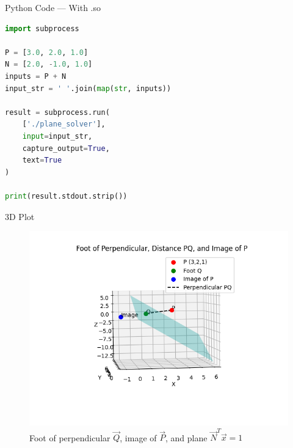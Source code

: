 \documentclass{beamer}
\begin{document}
\begin{frame}[fragile]{Python Code — With .so}
\begin{lstlisting}[language=Python]
import subprocess

P = [3.0, 2.0, 1.0]
N = [2.0, -1.0, 1.0]
inputs = P + N
input_str = ' '.join(map(str, inputs))

result = subprocess.run(
    ['./plane_solver'],
    input=input_str,
    capture_output=True,
    text=True
)

print(result.stdout.strip())
\end{lstlisting}
\end{frame}










\begin{frame}{3D Plot}
\begin{figure}[H]
\centering
\includegraphics[width=1\linewidth]{Figs/Fig_1.png}
\caption{Foot of perpendicular \( \vec{Q} \), image of \( \vec{P} \), and plane \( \vec{N}^T \vec{x} = 1 \)}
\end{figure}
\end{frame}
\end{document}
